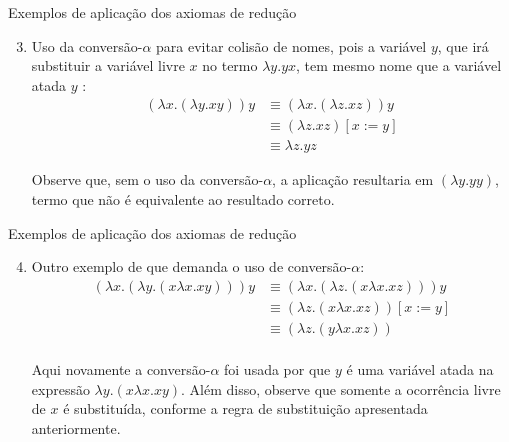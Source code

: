 \begin{frame}[fragile]{Exemplos de aplicação dos axiomas de redução}

    \begin{enumerate}
        \setcounter{enumi}{2}
        \item Uso da conversão-$\alpha$ para evitar colisão de nomes, pois a variável $y$, que
        irá substituir a variável livre $x$ no termo $\lambda y.yx$, tem mesmo nome que a
        variável atada $y$ :
        \begin{align*}
            (\lambda x.(\lambda y.xy))y & \equiv (\lambda x.(\lambda z.xz))y \\
            & \equiv (\lambda z.xz)[x:=y] \\
            & \equiv \lambda z.yz
        \end{align*}

        Observe que, sem o uso da conversão-$\alpha$, a aplicação resultaria em $(\lambda y.yy)$,
        termo que não é equivalente ao resultado correto.

    \end{enumerate}

\end{frame}

\begin{frame}[fragile]{Exemplos de aplicação dos axiomas de redução}

    \begin{enumerate}
        \setcounter{enumi}{3}
        \item Outro exemplo de que demanda o uso de conversão-$\alpha$:
        \begin{align*}
            (\lambda x.(\lambda y.(x\lambda x.xy)))y &\equiv (\lambda x.(\lambda z.(x\lambda x.xz)))y\\
            &\equiv (\lambda z.(x\lambda x.xz))[x:=y]\\
            &\equiv (\lambda z.(y\lambda x.xz))\\
        \end{align*}

        Aqui novamente a conversão-$\alpha$ foi usada por que $y$ é uma variável atada na
        expressão $\lambda y.(x\lambda x.xy)$. Além disso, observe que somente a ocorrência
        livre de $x$ é substituída, conforme a regra de substituição apresentada 
        anteriormente.
    \end{enumerate}

\end{frame}

